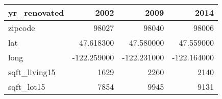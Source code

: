 \begin{table}[H]
\begin{tabular}{|l|r|r|r|}
\hline yr\_renovated & \cellcolor[rgb]{0.9, 0.54, 0.52} 2002 & 2009 & 2014 \\
\hline zipcode & \cellcolor[rgb]{0.9, 0.54, 0.52} 98027 & 98040 & 98006 \\
\hline lat & \cellcolor[rgb]{0.9, 0.54, 0.52} 47.618300 & 47.580000 & 47.559000 \\
\hline long & \cellcolor[rgb]{0.9, 0.54, 0.52} -122.259000 & \cellcolor[rgb]{0.9, 0.54, 0.52} -122.231000 & \cellcolor[rgb]{0.9, 0.54, 0.52} -122.164000 \\
\hline sqft\_living15 & \cellcolor[rgb]{0.9, 0.54, 0.52} 1629 & 2260 & 2140 \\
\hline sqft\_lot15 & \cellcolor[rgb]{0.9, 0.54, 0.52} 7854 & 9945 & 9131 \\
\hline
\end{tabular}
\end{table}
